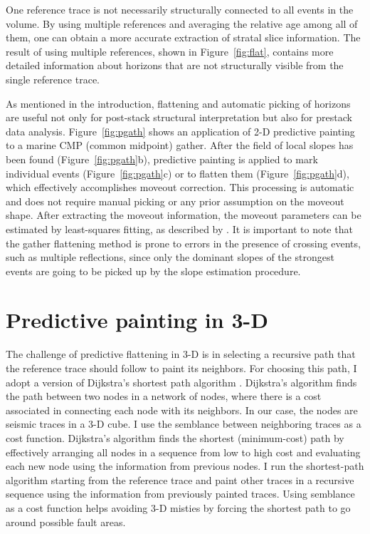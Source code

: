 One reference trace is not necessarily structurally connected to all
events in the volume. By using multiple references and averaging the
relative age among all of them, one can obtain a more accurate
extraction of stratal slice information. The result of using multiple
references, shown in Figure~\ref{fig:flat}, contains more detailed
information about horizons that are not structurally visible from the
single reference trace.

As mentioned in the introduction, flattening and automatic picking of
horizons are useful not only for post-stack structural interpretation
but also for prestack data analysis. Figure~\ref{fig:pgath} shows an
application of 2-D predictive painting to a marine CMP (common
midpoint) gather. After the field of local slopes has been found
(Figure~\ref{fig:pgath}b), predictive painting is applied to mark
individual events (Figure~\ref{fig:pgath}c) or to flatten them
(Figure~\ref{fig:pgath}d), which effectively accomplishes moveout
correction. This processing is automatic and does not require manual
picking or any prior assumption on the moveout shape. After extracting
the moveout information, the moveout parameters can be estimated by
least-squares fitting, as described by \cite{will}. It is
  important to note that the gather flattening method is prone to
  errors in the presence of crossing events, such as multiple
  reflections, since only the dominant slopes of the strongest events
  are going to be picked up by the slope estimation procedure.


\section{Predictive painting in 3-D}

The challenge of predictive flattening in 3-D is in selecting a
recursive path that the reference trace should follow to paint its
neighbors. For choosing this path, I adopt a version of Dijkstra's
shortest path algorithm \cite[]{dijkstra0,dijkstra}. Dijkstra's
algorithm finds the path between two nodes in a network of nodes,
where there is a cost associated in connecting each node with its
neighbors. In our case, the nodes are seismic traces in a 3-D cube.
I use the semblance between neighboring traces as a cost
function. Dijkstra's algorithm finds the shortest (minimum-cost)
path by effectively arranging all nodes in a sequence from low to
high cost and evaluating each new node using the information from
previous nodes. I run the shortest-path algorithm starting from the
reference trace and paint other traces in a recursive sequence using
the information from previously painted traces. 
Using semblance as a cost function helps avoiding 3-D misties by
  forcing the shortest path to go around possible fault areas.

